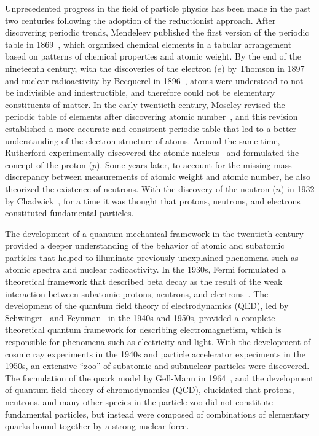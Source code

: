 \begin{refsection}
Unprecedented progress in the field of particle physics has been made in the past two centuries following the adoption of the reductionist approach.
After discovering periodic trends, Mendeleev published the first version of the periodic table in 1869~\cite{mendeleev1869relationship}, which organized chemical elements in a tabular arrangement based on patterns of chemical properties and atomic weight.
By the end of the nineteenth century, with the discoveries of the electron ($e$) by Thomson in 1897~\cite{thomson1897xl} and nuclear radioactivity by Becquerel in 1896~\cite{becquerel1896radiations}, atoms were understood to not be indivisible and indestructible, and therefore could not be elementary constituents of matter.
In the early twentieth century, Moseley revised the periodic table of elements after discovering atomic number~\cite{Egdell2020}, and this revision established a more accurate and consistent periodic table that led to a better understanding of the electron structure of atoms.
Around the same time, Rutherford experimentally discovered the atomic nucleus~\cite{rutherford1911lxxix} and formulated the concept of the proton ($p$).
Some years later, to account for the missing mass discrepancy between measurements of atomic weight and atomic number, he also theorized the existence of neutrons.
With the discovery of the neutron ($n$) in 1932 by Chadwick~\cite{chadwick1932possible}, for a time it was thought that protons, neutrons, and electrons constituted fundamental particles.

The development of a quantum mechanical framework in the twentieth century provided a deeper understanding of the behavior of atomic and subatomic particles that helped to illuminate previously unexplained phenomena such as atomic spectra and nuclear radioactivity.
In the 1930s, Fermi formulated a theoretical framework that described beta decay as the result of the weak interaction between subatomic protons, neutrons, and electrons~\cite{Wilson:1968pwx}.
The development of the quantum field theory of electrodynamics (QED), led by Schwinger~\cite{PhysRev.74.1439} and Feynman~\cite{PhysRev.76.769} in the 1940s and 1950s, provided a complete theoretical quantum framework for describing electromagnetism, which is responsible for phenomena such as electricity and light.
With the development of cosmic ray experiments in the 1940s and particle accelerator experiments in the 1950s, an extensive ``zoo'' of subatomic and subnuclear particles were discovered.
The formulation of the quark model by Gell-Mann in 1964~\cite{GELLMANN1964214}, and the development of quantum field theory of chromodynamics (QCD), elucidated that protons, neutrons, and many other species in the particle zoo did not constitute fundamental particles, but instead were composed of combinations of elementary quarks bound together by a strong nuclear force.


\end{refsection}
